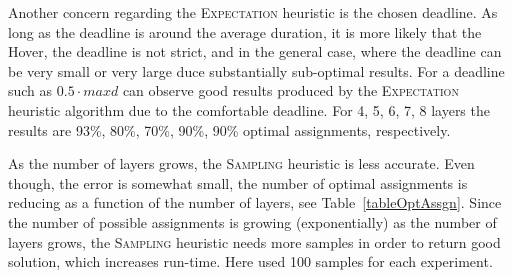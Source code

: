 \documentclass[letterpaper]{article} %
\newcommand{\commentout}[1]{}
\newcommand{\astar}{\textsc{A*}\xspace}
\newcommand{\sampling}{\textsc{Sampling}\xspace}
\newcommand{\expectation}{\textsc{Expectation}\xspace}
\begin{document}
Another concern regarding the \expectation heuristic is the chosen deadline. As long as the deadline is around the average duration, it is more likely that the \ex Hover, the deadline is not strict, and in the general case, where the deadline can be very small or very large duce substantially sub-optimal results. For a deadline such as $0.5\cdot maxd$  can observe good results produced by the \expectation heuristic algorithm due to the comfortable deadline. For 4, 5, 6, 7, 8 layers the results are 93\%, 80\%, 70\%, 90\%, 90\% optimal assignments, respectively.

\commentout{
\begin{figure}[h!]
	\scriptsize
	\begin{tikzpicture}
	\begin{axis}[
	scale=0.7,
	xlabel={\#Layers},
	ylabel near ticks,
	ylabel={\#Opt assignments},
	xmin=4, xmax=8,
	ymin=0, ymax=30,
	legend pos=outer north east,
	ymajorgrids=true,
	grid style=dashed,
	]

	\addplot[
	color=blue,
	mark=x,
	]
	coordinates {
		(4 , 30)
		(5 , 30)
		(6 , 30)
		(7 , 30)
		(8 , 30)

	};
	\addlegendentry{BF}

	\addplot[
	color=gray,
	mark=x,
	]
	coordinates {
		(4 , 30)
		(5 , 30)
		(6 , 30)
		(7 , 30)
		(8 , 30)

	};
	\addlegendentry{\astar}

	\addplot[
	color=green,
	mark=o,
	]
	coordinates {
		(4 , 30)
		(5 , 29)
		(6 , 25)
		(7 , 21)
        (8 , 22)
	};
	\addlegendentry{\sampling}


	\addplot[
	color=red,
	mark=square,
	]
	coordinates {
		(4 , 28)
		(5 , 24)
		(6 , 21)
		(7 , 27)
		(8 , 27)

	};
	\addlegendentry{\expectation}



	\end{axis}
	\end{tikzpicture}
	\caption{Number of optimal assignments comparison of all heuristic algorithms for deadline of size $0.5\cdot maxd$ and ``Structural" distribution}\label{05reg}
\end{figure}}

As the number of layers grows, the \sampling heuristic is less accurate. Even though, the error is somewhat small, the number of optimal assignments is reducing as a function of the number of layers, see Table~\ref{tableOptAssgn}. Since the number of possible assignments is growing (exponentially) as the number of layers grows, the \sampling heuristic needs more samples in order to return good solution, which increases run-time. Here  used 100 samples for each experiment.
\end{document}
